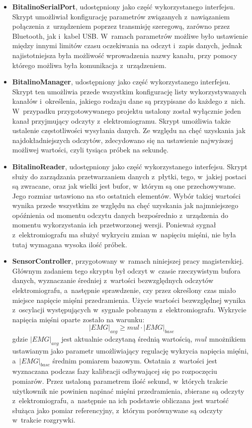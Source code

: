 \begin{itemize}
	\item \textbf{BitalinoSerialPort}, udostępniony jako część wykorzystanego interfejsu. Skrypt umożliwiał konfigurację parametrów związanych z~nawiązaniem połączenia z~urządzeniem poprzez transmisję szeregową, zarówno przez Bluetooth, jak i~kabel USB. W~ramach parametrów możliwe było ustawienie między innymi limitów czasu oczekiwania na odczyt i~zapis danych, jednak najistotniejsza była możliwość wprowadzenia nazwy kanału, przy pomocy którego możliwa była komunikacja z~urządzeniem. 
	\item \textbf{BitalinoManager}, udostępniony jako część wykorzystanego interfejsu. Skrypt ten umożliwia przede wszystkim konfigurację listy wykorzystywanych kanałów i~określenia, jakiego rodzaju dane są przypisane do każdego z~nich. W~przypadku przygotowywanego projektu ustalony został wyłącznie jeden kanał przyjmujący odczyty z~elektromiogramu. Skrypt umożliwia także ustalenie częstotliwości wysyłania danych. Ze względu na chęć uzyskania jak najdokładniejszych odczytów, zdecydowano się na ustawienie najwyższej możliwej wartości, czyli tysiąca próbek na sekundę.
	\item \textbf{BitalinoReader}, udostępniony jako część wykorzystanego interfejsu. Skrypt służy do zarządzania przetwarzaniem danych z~płytki, tego, w~jakiej postaci są zwracane, oraz jak wielki jest bufor, w~którym są one przechowywane. Jego rozmiar ustawiono na sto ostatnich elementów. Wybór takiej wartości wynika przede wszystkim ze względu na chęć uzyskania jak najmniejszego opóźnienia od momentu odczytu danych bezpośrednio z~urządzenia do momentu wykorzystania ich przetworzonej wersji. Ponieważ sygnał z~elektromiografu ma służyć wykryciu zmian w~napięciu mięśni, nie była tutaj wymagana wysoka ilość próbek.
	\item \textbf{SensorController}, przygotowany w~ramach niniejszej pracy magisterskiej. Głównym zadaniem tego skryptu był odczyt w~czasie rzeczywistym bufora danych, wyznaczanie średniej z~wartości bezwzględnych odczytów elektromiografu, a~następnie sprawdzenie, czy przez określony czas miało miejsce napięcie mięśni przedramienia. Użycie wartości bezwzględnej wynika z~oscylacji występujących w~sygnale pobranym z~elektromiografu. Wykrycie napięcia mięśni oparte zostało na warunku:
	$$
	|EMG|_{avg} \geq mul \cdot |EMG|_{base}
	$$
	gdzie $|EMG|_{avg}$ jest aktualnie odczytaną średnią wartością, $mul$ mnożnikiem ustawianym jako parametr umożliwiający regulację wykrycia napięcia mięśni, a~$|EMG|_{base}$ średnim pomiarem bazowym. Ostatnia z~wartości jest wyznaczana podczas fazy kalibracji odbywającej się po rozpoczęciu pomiarów. Przez ustaloną parametrem ilość sekund, w~których trakcie użytkownik nie powinien napinać mięśni przedramienia, zbierane są odczyty z~elektromiografu, a~następnie na ich podstawie obliczana jest wartość służąca jako pomiar referencyjny, z~którym porównywane są odczyty w~trakcie rozgrywki.
\end{itemize}
